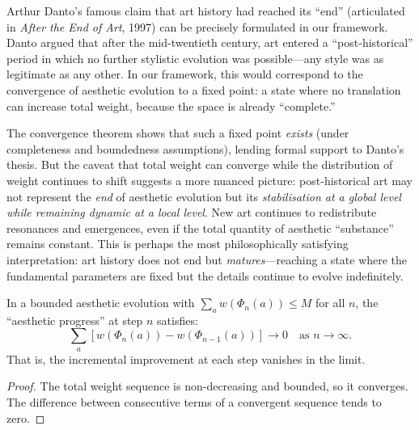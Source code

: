 \begin{remark}
\label{rem:danto-end-of-art}
Arthur Danto's famous claim that art history had reached its ``end'' (articulated in \textit{After the End of Art}, 1997) can be precisely formulated in our framework.  Danto argued that after the mid-twentieth century, art entered a ``post-historical'' period in which no further stylistic evolution was possible---any style was as legitimate as any other.  In our framework, this would correspond to the convergence of aesthetic evolution to a fixed point: a state where no translation can increase total weight, because the space is already ``complete.''

The convergence theorem shows that such a fixed point \emph{exists} (under completeness and boundedness assumptions), lending formal support to Danto's thesis.  But the caveat that total weight can converge while the distribution of weight continues to shift suggests a more nuanced picture: post-historical art may not represent the \emph{end} of aesthetic evolution but its \emph{stabilisation at a global level while remaining dynamic at a local level}.  New art continues to redistribute resonances and emergences, even if the total quantity of aesthetic ``substance'' remains constant.  This is perhaps the most philosophically satisfying interpretation: art history does not end but \emph{matures}---reaching a state where the fundamental parameters are fixed but the details continue to evolve indefinitely.
\end{remark}

\begin{theorem}
\label{thm:convergence-rate}
In a bounded aesthetic evolution with $\sum_a w(\Phi_n(a)) \leq M$ for all $n$, the ``aesthetic progress'' at step $n$ satisfies:
\[
  \sum_a [w(\Phi_n(a)) - w(\Phi_{n-1}(a))] \to 0 \quad \text{as } n \to \infty.
\]
That is, the incremental improvement at each step vanishes in the limit.
\end{theorem}

\begin{proof}
The total weight sequence is non-decreasing and bounded, so it converges.  The difference between consecutive terms of a convergent sequence tends to zero.
\end{proof}

